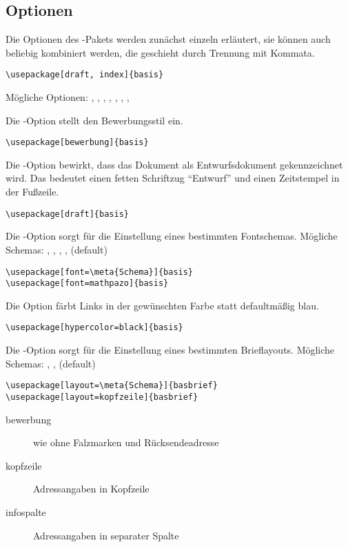 \subsection{Optionen}
\label{sec:user:options}

Die Optionen des -Pakets werden zunächst einzeln erläutert, sie können
auch beliebig kombiniert werden, die geschieht durch Trennung mit Kommata.

\verb#\usepackage[draft, index]{basis}#

Mögliche Optionen: , , , , , , , 


Die -Option stellt den Bewerbungsstil ein.

\verb#\usepackage[bewerbung]{basis}#


Die -Option bewirkt, dass das Dokument als Entwurfsdokument gekennzeichnet wird.
Das bedeutet einen fetten Schriftzug "`Entwurf"' und einen Zeitstempel in der Fußzeile.

\verb#\usepackage[draft]{basis}#


Die -Option sorgt für die Einstellung eines bestimmten Fontschemas.
Mögliche Schemas: , , , ,  (default)

\verb#\usepackage[font=\meta{Schema}]{basis}#\\
\verb#\usepackage[font=mathpazo]{basis}#


Die Option  färbt Links in der gewünschten Farbe statt defaultmäßig blau.

\verb#\usepackage[hypercolor=black]{basis}#


Die -Option sorgt für die Einstellung eines bestimmten Brieflayouts.
Mögliche Schemas: , ,  (default)

\verb#\usepackage[layout=\meta{Schema}]{basbrief}#\\
\verb#\usepackage[layout=kopfzeile]{basbrief}#

\begin{description}
		\item [bewerbung] wie  ohne Falzmarken und Rücksendeadresse
		\item [kopfzeile] Adressangaben in Kopfzeile
		\item [infospalte] Adressangaben in separater Spalte
\end{description}


